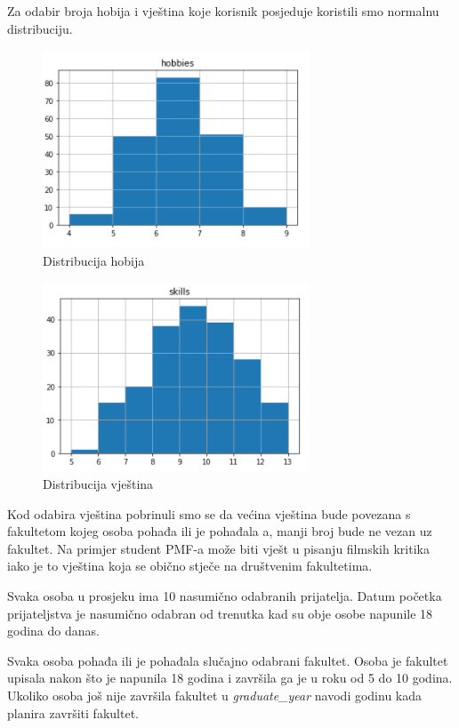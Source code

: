 \documentclass[titlepage, 12pt]{scrartcl}
\begin{document}
	Za odabir broja hobija i vještina koje korisnik posjeduje koristili smo normalnu distribuciju.
	\newpage
	\begin{figure}[h]
		\centering
		\includegraphics{slike/Hobbies_distribution.png}
		\caption{Distribucija hobija}
		\label{fig:hobbies}
	\end{figure}
	
	\begin{figure}[h]
		\centering
		\includegraphics{slike/Skills_distribution.png}
		\caption{Distribucija vještina}
		\label{fig:skills}
	\end{figure}
	Kod odabira vještina pobrinuli smo se da većina vještina bude povezana s fakultetom kojeg osoba pohađa ili je pohađala a, manji broj bude ne vezan uz fakultet. Na primjer student PMF-a može biti vješt u pisanju filmskih kritika iako je to vještina koja se obično stječe na društvenim fakultetima.
	
	Svaka osoba u prosjeku ima 10 nasumično odabranih prijatelja. Datum početka prijateljstva je nasumično odabran od trenutka kad su obje osobe napunile 18 godina do danas.
	
	Svaka osoba pohađa ili je pohađala slučajno odabrani fakultet. Osoba je fakultet upisala nakon što je napunila 18 godina i završila ga je u roku od 5 do 10 godina. Ukoliko osoba još nije završila fakultet u \emph{graduate\_year} navodi godinu kada planira završiti fakultet.
	
\end{document}
